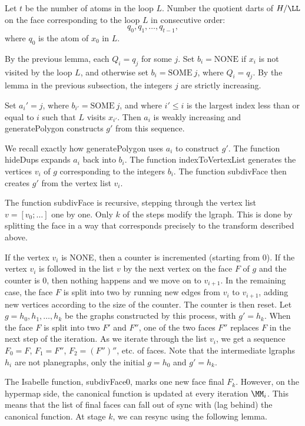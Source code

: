 Let $t$ be the number of atoms in the loop $L$.  Number the quotient
darts of $H/\LL$ on the face corresponding to the loop $L$ in
consecutive order:
\[
q_0,q_1,\ldots,q_{t-1},
\]
where $q_0$ is the atom of $x_0$ in $L$.

By the previous lemma, each $Q_i = q_j$ for some $j$.
Set $b_i = \text{NONE}$
if $x_i$ is not visited by the loop $L$, and otherwise set 
$b_i = \text{SOME}~j$,
where $Q_i = q_j$.
By the  lemma in the previous subsection, 
the integers $j$ are strictly increasing.

Set $a_i' = j$, where $b_{i'} = \text{SOME}~j$, and
where $i'\le i$ is the largest index less than or equal to $i$ such
that $L$ visits $x_{i'}$.  Then $a_i$ is weakly increasing and
generatePolygon constructs $g'$ from this sequence.

We recall exactly how generatePolygon uses $a_i$ to construct
$g'$.  The function hideDups expands $a_i$ back into $b_i$.
The function indexToVertexList generates the
vertices $v_i$ of $g$ corresponding to the integers $b_i$.
The function subdivFace then creates $g'$ from the vertex list $v_i$.

The function subdivFace is recursive, stepping through the vertex list
$v=[v_0;\ldots]$ one by one.  Only $k$ of the steps modify the lgraph.
This is done by splitting the face in a way that corresponds precisely
to the transform described above.

If the vertex $v_i$ is NONE, then a counter is incremented (starting
from 0).  If the vertex $v_i$ is followed in the list $v$ by the next
vertex on the face $F$ of $g$ and the counter is $0$, then nothing
happens and we move on to $v_{i+1}$.  In the remaining case, the face
$F$ is split into two by running new edges from $v_i$ to $v_{i+1}$,
adding new vertices according to the size of the counter.  The counter
is then reset.  Let $g=h_0,h_1,\ldots,h_k$ be the graphs constructed
by this process, with $g' = h_k$.  When the face $F$ is split into two
$F'$ and $F''$, one of the two faces $F''$ replaces $F$ in the next
step of the iteration.  As we iterate through the list $v_i$, we get a
sequence $F_0=F$, $F_1 =F''$, $F_2 = (F'')''$, etc.  of faces.  Note
that the intermediate lgraphs $h_i$ are not planegraphs, only the
initial $g=h_0$ and $g'=h_k$.

The Isabelle function, subdivFace0, marks one new face final $F_k$.
However, on the hypermap side, the canonical function is updated at
every iteration $\MM_i$.  This means that the list of final faces can
fall out of sync with (lag behind) the canonical function.  At stage
$k$, we can resync using the following lemma.

